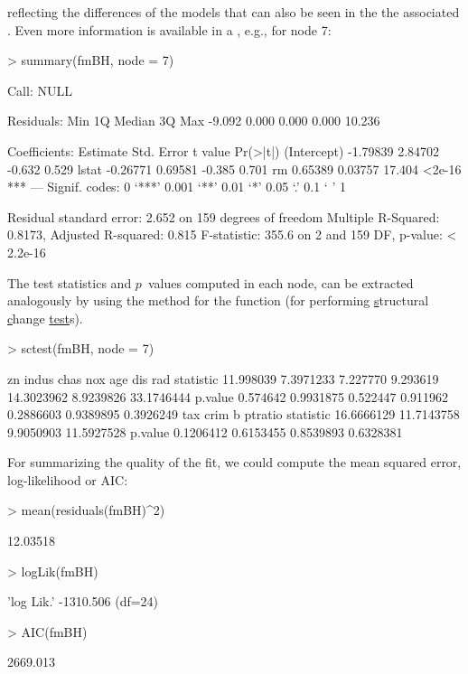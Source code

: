 \documentclass{Z}
\begin{document}
reflecting the differences of the models that can also be seen in the the associated
. Even more information is available in a , e.g., for node 7:

\begin{Schunk}
\begin{Sinput}
> summary(fmBH, node = 7)
\end{Sinput}
\begin{Soutput}
Call:
NULL

Residuals:
   Min     1Q Median     3Q    Max 
-9.092  0.000  0.000  0.000 10.236 

Coefficients:
            Estimate Std. Error t value Pr(>|t|)    
(Intercept) -1.79839    2.84702  -0.632    0.529    
lstat       -0.26771    0.69581  -0.385    0.701    
rm           0.65389    0.03757  17.404   <2e-16 ***
---
Signif. codes:  0 ‘***’ 0.001 ‘**’ 0.01 ‘*’ 0.05 ‘.’ 0.1 ‘ ’ 1 

Residual standard error: 2.652 on 159 degrees of freedom
Multiple R-Squared: 0.8173,	Adjusted R-squared: 0.815 
F-statistic: 355.6 on 2 and 159 DF,  p-value: < 2.2e-16 
\end{Soutput}
\end{Schunk}

The test statistics and $p$~values computed in each node, can be extracted analogously
by using the method for the function  (for performing \underline{s}tructural
\underline{c}hange \underline{test}s).

\begin{Schunk}
\begin{Sinput}
> sctest(fmBH, node = 7)
\end{Sinput}
\begin{Soutput}
                 zn     indus     chas      nox        age       dis        rad
statistic 11.998039 7.3971233 7.227770 9.293619 14.3023962 8.9239826 33.1746444
p.value    0.574642 0.9931875 0.522447 0.911962  0.2886603 0.9389895  0.3926249
                 tax       crim         b    ptratio
statistic 16.6666129 11.7143758 9.9050903 11.5927528
p.value    0.1206412  0.6153455 0.8539893  0.6328381
\end{Soutput}
\end{Schunk}

For summarizing the quality of the fit, we could compute the mean squared error, log-likelihood
or AIC:

\begin{Schunk}
\begin{Sinput}
> mean(residuals(fmBH)^2)
\end{Sinput}
\begin{Soutput}
[1] 12.03518
\end{Soutput}
\begin{Sinput}
> logLik(fmBH)
\end{Sinput}
\begin{Soutput}
'log Lik.' -1310.506 (df=24)
\end{Soutput}
\begin{Sinput}
> AIC(fmBH)
\end{Sinput}
\begin{Soutput}
[1] 2669.013
\end{Soutput}
\end{Schunk}
\end{document}
